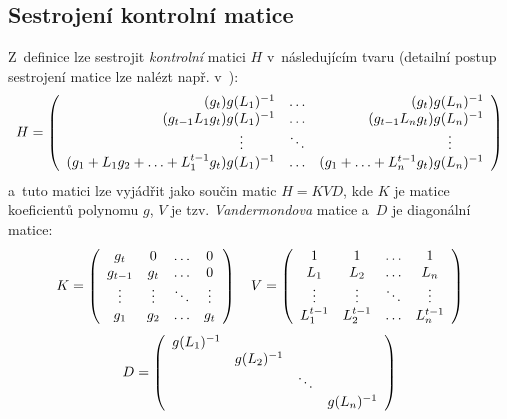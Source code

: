 \documentclass[thesis=M,czech,hidelinks]{FITthesis}[2012/06/26]
\newcommand{\0}{{\textcolor[gray]{0.75}{0}}}
\begin{document}
\vfill


\subsection{Sestrojení kontrolní matice}

Z~definice lze sestrojit \emph{kontrolní} matici $H$ v~následujícím tvaru
(detailní postup sestrojení matice lze nalézt např. v~\cite{Kotil}):
$$
    H = \left(\begin{array}{r c r}
        (           g_t) g(L_1)^{-1} & \ldots & (           g_t) g(L_n)^{-1} \\
        (g_{t-1}L_1 g_t) g(L_1)^{-1} & \ldots & (g_{t-1}L_n g_t) g(L_n)^{-1} \\
        \vdots \qquad \;             & \ddots & \vdots \qquad \;             \\
        (g_1 + L_1 g_2 + \ldots + L_1^{t-1} g_t) g(L_1)^{-1} &
            \ldots  &
            (g_1 + \ldots + L_n^{t-1} g_t) g(L_n)^{-1} \\
    \end{array}\right)
$$
a~tuto matici lze vyjádřit jako součin matic $ H = KVD $, kde $K$ je matice
koeficientů polynomu $g$, $V$ je tzv. \emph{Vandermondova} matice a~$D$ je
diagonální matice:
$$
    K = \left(\begin{array}{c c c c}
        g_t     & 0      & \ldots & 0      \\
        g_{t-1} & g_t    & \ldots & 0      \\
        \vdots  & \vdots & \ddots & \vdots \\
        g_1     & g_2    & \ldots & g_t    \\
    \end{array}\right)
    \quad
    V = \left(\begin{array}{c c c c}
        1         & 1         & \ldots & 1         \\
        L_1       & L_2       & \ldots & L_n       \\
        \vdots    & \vdots    & \ddots & \vdots    \\
        L_1^{t-1} & L_2^{t-1} & \ldots & L_n^{t-1} \\
    \end{array}\right)
$$
$$
    D = \left(\begin{array}{c c c c}
        g(L_1)^{-1} &             &        &             \\
                    & g(L_2)^{-1} &        &             \\
                    &             & \ddots &             \\
                    &             &        & g(L_n)^{-1} \\
    \end{array}\right)
$$
\end{document}
